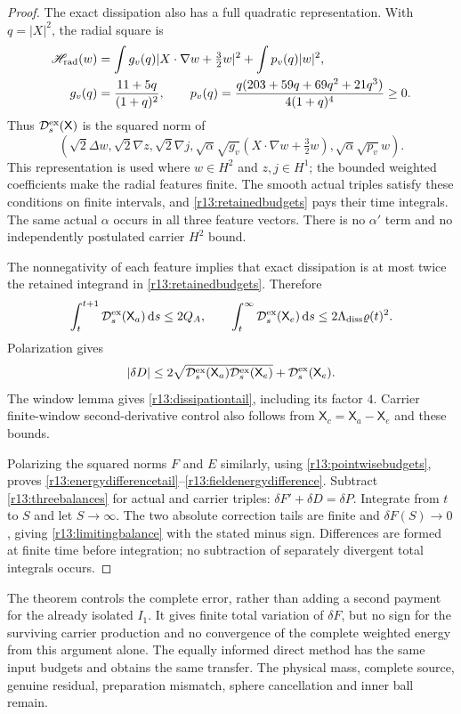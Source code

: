 \documentclass[11pt]{article}
\numberwithin{equation}{section}
\newcommand{\dd}{\,\mathrm d}
\begin{document}
\begin{proof}
The exact dissipation also has a full quadratic representation. With
$q=|X|^2$, the radial square is
\begin{align}
 \mathscr H_{\rm rad}(w)
 &=\int g_v(q)|X\cdot\nabla w+\tfrac32w|^2
                      +\int p_v(q)|w|^2,\nonumber\\
 g_v(q)&=\frac{11+5q}{(1+q)^2},\qquad
 p_v(q)=\frac{q(203+59q+69q^2+21q^3)}{4(1+q)^4}\ge0.
 \label{r13:radialfeatures}
\end{align}
Thus $\mathcal D^{\rm ex}_s(\mathsf X)$ is the squared norm of
\[
 \left(\sqrt2\Delta w,\sqrt2\nabla z,\sqrt2\nabla j,
 \sqrt\alpha\sqrt{g_v}(X\cdot\nabla w+\tfrac32w),
 \sqrt\alpha\sqrt{p_v}w\right).
\]
This representation is used where $w\in H^2$ and $z,j\in H^1$;
the bounded weighted coefficients make the radial features finite.
The smooth actual triples satisfy these conditions on finite intervals,
and \eqref{r13:retainedbudgets} pays their time integrals. The same
actual $\alpha$ occurs in all three feature vectors. There is no
$\alpha'$ term and no independently postulated carrier $H^2$ bound.

The nonnegativity of each feature implies that exact dissipation is
at most twice the retained integrand in
\eqref{r13:retainedbudgets}. Therefore
\[
 \int_t^{t+1}\mathcal D^{\rm ex}_s(\mathsf X_a)\dd s\le2Q_A,
 \qquad
 \int_t^\infty\mathcal D^{\rm ex}_s(\mathsf X_e)\dd s
                              \le2\Lambda_{\rm diss}\varrho(t)^2.
\]
Polarization gives
\[
 |\delta D|\le2\sqrt{\mathcal D^{\rm ex}_s(\mathsf X_a)
                         \mathcal D^{\rm ex}_s(\mathsf X_e)}
                             +\mathcal D^{\rm ex}_s(\mathsf X_e).
\]
The window lemma gives \eqref{r13:dissipationtail}, including its
factor $4$. Carrier finite-window second-derivative control also follows
from $\mathsf X_c=\mathsf X_a-\mathsf X_e$ and these bounds.

Polarizing the squared norms $F$ and $E$ similarly, using
\eqref{r13:pointwisebudgets}, proves
\eqref{r13:energydifferencetail}--\eqref{r13:fieldenergydifference}.
Subtract \eqref{r13:threebalances} for actual and carrier triples:
$\delta F'+\delta D=\delta P$. Integrate from $t$ to $S$ and let
$S\to\infty$. The two absolute correction tails are finite and
$\delta F(S)\to0$, giving \eqref{r13:limitingbalance} with the stated
minus sign. Differences are formed at finite time before integration;
no subtraction of separately divergent total integrals occurs.
\end{proof}

The theorem controls the complete error, rather than adding a second
payment for the already isolated $I_1$. It gives finite total variation
of $\delta F$, but no sign for the surviving carrier production and no
convergence of the complete weighted energy from this argument alone.
The equally informed direct method has the same input budgets and
obtains the same transfer. The physical mass, complete source, genuine
residual, preparation mismatch, sphere cancellation and inner ball remain.
\end{document}
